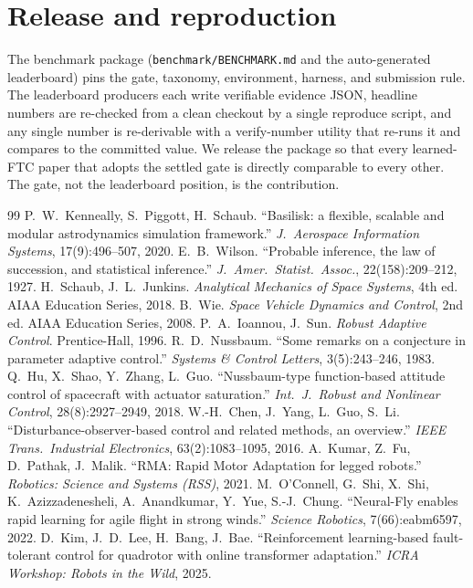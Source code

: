 \documentclass[11pt]{article}
\begin{document}
\section{Release and reproduction}
The benchmark package (\texttt{benchmark/BENCHMARK.md} and the auto-generated leaderboard) pins the
gate, taxonomy, environment, harness, and submission rule. The leaderboard producers each write
verifiable evidence JSON, headline numbers are re-checked from a clean checkout by a single
reproduce script, and any single number is re-derivable with a verify-number utility that re-runs it
and compares to the committed value. We release the package so that every learned-FTC paper that
adopts the settled gate is directly comparable to every other. The gate, not the leaderboard
position, is the contribution.

\begin{thebibliography}{99}\small
{} P.~W.~Kenneally, S.~Piggott, H.~Schaub. ``Basilisk: a flexible, scalable and modular astrodynamics simulation framework.'' \emph{J.\ Aerospace Information Systems}, 17(9):496--507, 2020.
 E.~B.~Wilson. ``Probable inference, the law of succession, and statistical inference.'' \emph{J.\ Amer.\ Statist.\ Assoc.}, 22(158):209--212, 1927.
 H.~Schaub, J.~L.~Junkins. \emph{Analytical Mechanics of Space Systems}, 4th ed. AIAA Education Series, 2018.
 B.~Wie. \emph{Space Vehicle Dynamics and Control}, 2nd ed. AIAA Education Series, 2008.
 P.~A.~Ioannou, J.~Sun. \emph{Robust Adaptive Control}. Prentice-Hall, 1996.
 R.~D.~Nussbaum. ``Some remarks on a conjecture in parameter adaptive control.'' \emph{Systems \& Control Letters}, 3(5):243--246, 1983.
 Q.~Hu, X.~Shao, Y.~Zhang, L.~Guo. ``Nussbaum-type function-based attitude control of spacecraft with actuator saturation.'' \emph{Int.\ J.\ Robust and Nonlinear Control}, 28(8):2927--2949, 2018.
 W.-H.~Chen, J.~Yang, L.~Guo, S.~Li. ``Disturbance-observer-based control and related methods, an overview.'' \emph{IEEE Trans.\ Industrial Electronics}, 63(2):1083--1095, 2016.
 A.~Kumar, Z.~Fu, D.~Pathak, J.~Malik. ``RMA: Rapid Motor Adaptation for legged robots.'' \emph{Robotics: Science and Systems (RSS)}, 2021.
 M.~O'Connell, G.~Shi, X.~Shi, K.~Azizzadenesheli, A.~Anandkumar, Y.~Yue, S.-J.~Chung. ``Neural-Fly enables rapid learning for agile flight in strong winds.'' \emph{Science Robotics}, 7(66):eabm6597, 2022.
 D.~Kim, J.~D.~Lee, H.~Bang, J.~Bae. ``Reinforcement learning-based fault-tolerant control for quadrotor with online transformer adaptation.'' \emph{ICRA Workshop: Robots in the Wild}, 2025.

\end{thebibliography}
\end{document}
